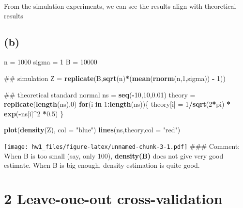 \documentclass[]{article}
\newenvironment{Shaded}{\begin{snugshade}}{\end{snugshade}}
\newcommand{\KeywordTok}[1]{\textcolor[rgb]{0.13,0.29,0.53}{\textbf{#1}}}
\newcommand{\DataTypeTok}[1]{\textcolor[rgb]{0.13,0.29,0.53}{#1}}
\newcommand{\DecValTok}[1]{\textcolor[rgb]{0.00,0.00,0.81}{#1}}
\newcommand{\FloatTok}[1]{\textcolor[rgb]{0.00,0.00,0.81}{#1}}
\newcommand{\StringTok}[1]{\textcolor[rgb]{0.31,0.60,0.02}{#1}}
\newcommand{\ControlFlowTok}[1]{\textcolor[rgb]{0.13,0.29,0.53}{\textbf{#1}}}
\newcommand{\OperatorTok}[1]{\textcolor[rgb]{0.81,0.36,0.00}{\textbf{#1}}}
\newcommand{\NormalTok}[1]{#1}
\begin{document}
From the simulation experiments, we can see the results align with
theoretical results

\subsection{(b)}\label{b}

\begin{Shaded}
\begin{Highlighting}[]
\NormalTok{n =}\StringTok{ }\DecValTok{1000}
\NormalTok{sigma =}\StringTok{ }\DecValTok{1}
\NormalTok{B =}\StringTok{ }\DecValTok{10000}

\NormalTok{## simulation}
\NormalTok{Z =}\StringTok{ }\KeywordTok{replicate}\NormalTok{(B,}\KeywordTok{sqrt}\NormalTok{(n)}\OperatorTok{*}\NormalTok{(}\KeywordTok{mean}\NormalTok{(}\KeywordTok{rnorm}\NormalTok{(n,}\DecValTok{1}\NormalTok{,sigma)) }\OperatorTok{-}\StringTok{ }\DecValTok{1}\NormalTok{))}

\NormalTok{## theoretical standard normal}
\NormalTok{ns =}\StringTok{ }\KeywordTok{seq}\NormalTok{(}\OperatorTok{-}\DecValTok{10}\NormalTok{,}\DecValTok{10}\NormalTok{,}\FloatTok{0.01}\NormalTok{)}
\NormalTok{theory =}\StringTok{ }\KeywordTok{replicate}\NormalTok{(}\KeywordTok{length}\NormalTok{(ns),}\DecValTok{0}\NormalTok{)}
\ControlFlowTok{for}\NormalTok{(i }\ControlFlowTok{in} \DecValTok{1}\OperatorTok{:}\KeywordTok{length}\NormalTok{(ns))\{}
\NormalTok{  theory[i] =}\StringTok{ }\DecValTok{1}\OperatorTok{/}\KeywordTok{sqrt}\NormalTok{(}\DecValTok{2}\OperatorTok{*}\NormalTok{pi) }\OperatorTok{*}\StringTok{ }\KeywordTok{exp}\NormalTok{(}\OperatorTok{-}\NormalTok{ns[i]}\OperatorTok{^}\DecValTok{2} \OperatorTok{*}\FloatTok{0.5}\NormalTok{)}
\NormalTok{\}}

\KeywordTok{plot}\NormalTok{(}\KeywordTok{density}\NormalTok{(Z), }\DataTypeTok{col =} \StringTok{"blue"}\NormalTok{)}
\KeywordTok{lines}\NormalTok{(ns,theory,}\DataTypeTok{col =} \StringTok{"red"}\NormalTok{)}
\end{Highlighting}
\end{Shaded}

\texttt{[image: hw1\_files/figure-latex/unnamed-chunk-3-1.pdf]} \#\#\#
Comment: When B is too small (say, only 100), \textbf{density(B)} does
not give very good estimate. When B is big enough, density estimation is
quite good.

\section{2 Leave-oue-out
cross-validation}\label{leave-oue-out-cross-validation}
\end{document}

